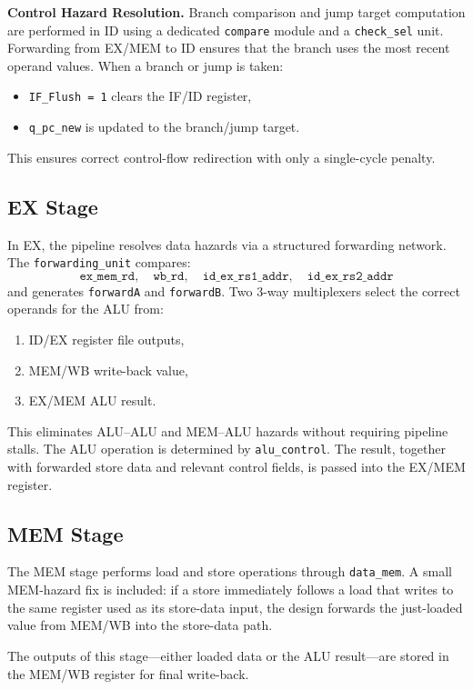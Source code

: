 \documentclass{article}
\begin{document}
\textbf{Control Hazard Resolution.}
Branch comparison and jump target computation are performed in ID using a dedicated \texttt{compare} module and a \texttt{check\_sel} unit. Forwarding from EX/MEM to ID ensures that the branch uses the most recent operand values. When a branch or jump is taken:
\begin{itemize}
    \item \texttt{IF\_Flush = 1} clears the IF/ID register,
    \item \texttt{q\_pc\_new} is updated to the branch/jump target.
\end{itemize}
This ensures correct control-flow redirection with only a single-cycle penalty.


\subsection{EX Stage}

In EX, the pipeline resolves data hazards via a structured forwarding network. The \texttt{forwarding\_unit} compares:
\[
\texttt{ex\_mem\_rd}, \quad \texttt{wb\_rd}, \quad \texttt{id\_ex\_rs1\_addr}, \quad \texttt{id\_ex\_rs2\_addr}
\]
and generates \texttt{forwardA} and \texttt{forwardB}. Two 3-way multiplexers select the correct operands for the ALU from:
\begin{enumerate}
    \item ID/EX register file outputs,
    \item MEM/WB write-back value,
    \item EX/MEM ALU result.
\end{enumerate}

This eliminates ALU–ALU and MEM–ALU hazards without requiring pipeline stalls. The ALU operation is determined by \texttt{alu\_control}. The result, together with forwarded store data and relevant control fields, is passed into the EX/MEM register.


\subsection{MEM Stage}

The MEM stage performs load and store operations through \texttt{data\_mem}. A small MEM-hazard fix is included: if a store immediately follows a load that writes to the same register used as its store-data input, the design forwards the just-loaded value from MEM/WB into the store-data path.

The outputs of this stage—either loaded data or the ALU result—are stored in the MEM/WB register for final write-back.
\end{document}
